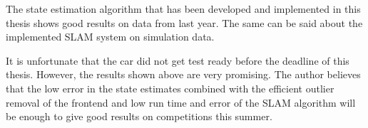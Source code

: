
The state estimation algorithm that has been developed and implemented in this thesis shows good results on data from last year. The same can be said about the implemented \gls{SLAM} system on simulation data. 

It is unfortunate that the car did not get test ready before the deadline of this thesis. However, the results shown above are very promising. The author believes that the low error in the state estimates combined with the efficient outlier removal of the frontend and low run time and error of the \gls{SLAM} algorithm will be enough to give good results on competitions this summer.  